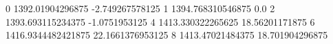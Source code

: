 0 1392.01904296875 -2.749267578125
1 1394.768310546875 0.0
2 1393.693115234375 -1.0751953125
4 1413.330322265625 18.56201171875
6 1416.9344482421875 22.1661376953125
8 1413.47021484375 18.701904296875
